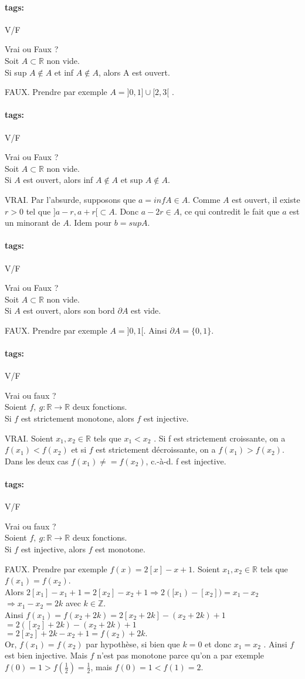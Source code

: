 \documentclass[12pt]{article}
\newcommand*{\xfield}[1]{\begin{mdframed}\centering #1\end{mdframed}\bigskip}
\newenvironment{note}{}{}
\newcommand*{\tags}[1]{\paragraph{tags: }#1}
\begin{document}
\begin{note}
\tags{V/F}
	\xfield{Vrai ou Faux ?\\
Soit $A \subset \mathbb{R}$ non vide.\\
Si sup $A \not\in A$ et inf $A \not\in A$, alors A est ouvert.}
	\xfield{FAUX.
Prendre par exemple $A = ]0, 1] \cup [2, 3[$ .}
\end{note}

\begin{note}
\tags{V/F}
	\xfield{Vrai ou Faux ?\\
Soit $A \subset \mathbb{R}$ non vide.\\
Si $A$ est ouvert, alors inf $A \not\in A$ et sup $A \not\in A$.}
	\xfield{VRAI.
Par l’absurde, supposons que $a = inf A \in A$. Comme $A$ est ouvert, il existe $r > 0$ tel que
$]a - r, a + r[ \subset A$. Donc $a - 2 r \in A$, ce qui contredit le fait que $a$ est un minorant de $A$.
Idem pour $b = sup A$.}
\end{note}

\begin{note}
\tags{V/F}
	\xfield{Vrai ou Faux ?\\
Soit $A \subset \mathbb{R}$ non vide.\\
Si $A$ est ouvert, alors son bord $\partial A$ est vide.}
	\xfield{FAUX.
Prendre par exemple $A = ]0, 1[$. Ainsi $\partial A = \{0, 1\}$.}
\end{note}


\begin{note}
\tags{V/F}
	\xfield{Vrai ou faux ?\\
	Soient $f,\ g : \mathbb{R} \to \mathbb{R}$ deux fonctions.\\
	Si $f$ est strictement monotone, alors $f$ est injective.}
	\xfield{VRAI. Soient $x_1 , x_2 \in \mathbb{R}$ tels que $x_1 < x_2$ . Si f est strictement croissante, on a $f (x_1 ) < f (x_2 )$ et si $f$ est strictement décroissante, on a $f(x_1 ) > f(x_2 )$. Dans les deux cas $f(x_1) \neq = f(x_2)$, c.-à-d. f est injective.}
\end{note}

\begin{note}
\tags{V/F}
	\xfield{Vrai ou faux ?\\
	Soient $f,\ g : \mathbb{R} \to \mathbb{R}$ deux fonctions.\\
	Si $f$ est injective, alors $f$ est monotone.}
	\xfield{FAUX. Prendre par exemple $f(x) = 2[x] - x + 1$. Soient $x_1 , x_2 \in \mathbb{R}$ tels que $f(x_1 ) = f(x_2 )$.\\
	Alors $2[x_1] - x_1 + 1 = 2[x_2] - x_2 + 1 \Rightarrow 2([x_1)-[x_2]) = x_1 - x_2$\\
	$\Rightarrow x_1 - x_2 = 2k$ avec $k \in \mathbb{Z}$.\\
Ainsi $f(x_1 ) = f(x_2 + 2k) = 2[x_2 + 2k] - (x_2 + 2k) + 1$ \\
$= 2([x_2 ] + 2k) - (x_2 + 2k) + 1$\\
$= 2[x_2 ] + 2k - x_2 + 1 = f(x_2 ) + 2k.$\\
Or, $f(x_1 ) = f(x_2 )$ par hypothèse, si bien que $k = 0$ et donc $x_1 = x_2$ . Ainsi $f$ est bien
injective. Mais $f$ n’est pas monotone parce qu’on a par exemple $f(0) = 1 > f(\frac{1}{2}) = \frac{1}{2}$, mais $f(0) = 1 < f(1) = 2$.}
\end{note}
\end{document}
